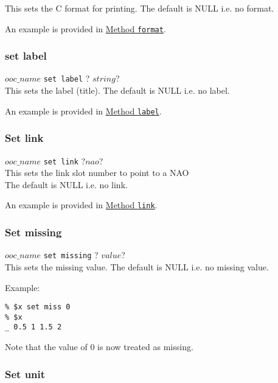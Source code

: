 This sets the C format for printing. The default is NULL i.e. no
  format.
  

An example is provided in 
  \href{ooc-meta.html\#format}{Method \texttt{format}}.
  \subsubsection{
    \label{set-label}set label
  }

  


  $ooc\_name$ 
  \texttt{set label} ?
  $string$?
  \\
  

This sets the label (title). The default is NULL i.e. no
  label.
  

An example is provided in 
  \href{ooc-meta.html\#label}{Method \texttt{label}}.

  \subsubsection{
    \label{set-link}Set link
  }

  


  $ooc\_name$ \texttt{set link} ?$nao$?
  \\
  

This sets the link slot number to point to a NAO
  \\The default is NULL i.e. no link.
  

An example is provided in 
  \href{ooc-meta.html\#link}{Method \texttt{link}}.
  \subsubsection{
    \label{set-missing}Set missing
  }

  


  $ooc\_name$ 
  \texttt{set missing} ?
  $value$?
  \\
  

This sets the missing value. The default is NULL i.e. no missing
  value.
  

Example:
  \begin{verbatim}
% $x set miss 0
% $x
_ 0.5 1 1.5 2
\end{verbatim}

Note that the value of 0 is now treated as missing.
  \subsubsection{
    \label{set-unit}Set unit
  }

